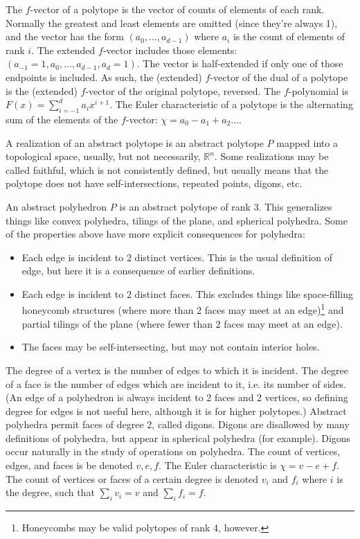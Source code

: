 \documentclass{amsart}[12pt]
\begin{document}
The $f$-vector of a polytope is the vector of counts of elements of each rank.
Normally the greatest and least elements are omitted (since they're always 1),
and the vector has the form $(a_0, \ldots, a_{d-1})$ where $a_i$ is the count
of elements of rank $i$. The extended $f$-vector includes those elements:
$(a_{-1}=1, a_0, \ldots, a_{d-1}, a_d=1)$. The vector is half-extended if
only one of those endpoints is included. As such, the (extended) $f$-vector of
the dual of a polytope is the (extended) $f$-vector of the original polytope,
reversed. The $f$-polynomial is $F(x) = \sum_{i=-1}^d a_i x^{i+1}$.
The Euler characteristic of a polytope is the alternating
sum of the elements of the $f$-vector: $\chi = a_0 - a_1 + a_2 \ldots$.

A realization of an abstract polytope is an abstract polytope $P$ mapped into
a topological space, usually, but not necessarily, $\mathbb{R}^n$. Some
realizations may be called faithful, which is not consistently defined, but
usually means that the polytope does not have self-intersections,
repeated points, digons, etc.

An abstract polyhedron $P$ is an abstract polytope of rank 3. This generalizes
things like convex polyhedra, tilings of the plane, and spherical polyhedra.
Some of the properties above have more explicit consequences for
polyhedra: \cite{grunbaum1}
\begin{itemize}
  \item Each edge is incident to 2 distinct vertices. This is the usual
  definition of edge, but here it is a consequence of earlier definitions.
  \item Each edge is incident to 2 distinct faces. This excludes things like
  space-filling honeycomb structures (where more than 2 faces may meet at an
  edge)\footnote{Honeycombs may be valid polytopes of rank 4, however.} and
  partial tilings of the plane (where fewer than 2 faces may meet at an edge).
  \item The faces may be self-intersecting, but may not contain interior holes.
\end{itemize}
The degree of a vertex is the number of edges to which it is incident. The
degree of a face is the number of edges which are incident to it, i.e. its
number of sides. (An edge of a polyhedron is always incident to 2 faces and 2
vertices, so defining degree for edges is not useful here, although it is for
higher polytopes.)
Abstract polyhedra permit faces of degree 2, called digons. Digons are
disallowed by many definitions of polyhedra, but appear in spherical polyhedra
(for example). Digons occur naturally in the study of operations on polyhedra.
The count of vertices, edges, and faces is be denoted $v, e, f$. The Euler
characteristic is $\chi = v - e + f$. The count of vertices or faces of a
certain degree is denoted $v_i$ and $f_i$ where $i$ is the degree, such that
$\sum_i v_i = v$ and $\sum_i f_i = f$.
\end{document}

